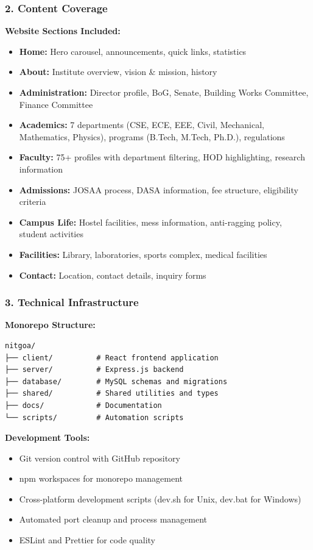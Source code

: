 \documentclass[12pt,a4paper]{report}
\begin{document}
\subsubsection*{2. Content Coverage}
\textbf{Website Sections Included:}
\begin{itemize}
    \item \textbf{Home:} Hero carousel, announcements, quick links, statistics
    \item \textbf{About:} Institute overview, vision \& mission, history
    \item \textbf{Administration:} Director profile, BoG, Senate, Building Works Committee, Finance Committee
    \item \textbf{Academics:} 7 departments (CSE, ECE, EEE, Civil, Mechanical, Mathematics, Physics), programs (B.Tech, M.Tech, Ph.D.), regulations
    \item \textbf{Faculty:} 75+ profiles with department filtering, HOD highlighting, research information
    \item \textbf{Admissions:} JOSAA process, DASA information, fee structure, eligibility criteria
    \item \textbf{Campus Life:} Hostel facilities, mess information, anti-ragging policy, student activities
    \item \textbf{Facilities:} Library, laboratories, sports complex, medical facilities
    \item \textbf{Contact:} Location, contact details, inquiry forms
\end{itemize}

\subsubsection*{3. Technical Infrastructure}

\textbf{Monorepo Structure:}
\begin{lstlisting}
nitgoa/
├── client/          # React frontend application
├── server/          # Express.js backend
├── database/        # MySQL schemas and migrations
├── shared/          # Shared utilities and types
├── docs/            # Documentation
└── scripts/         # Automation scripts
\end{lstlisting}

\textbf{Development Tools:}
\begin{itemize}
    \item Git version control with GitHub repository
    \item npm workspaces for monorepo management
    \item Cross-platform development scripts (dev.sh for Unix, dev.bat for Windows)
    \item Automated port cleanup and process management
    \item ESLint and Prettier for code quality
\end{itemize}
\end{document}
